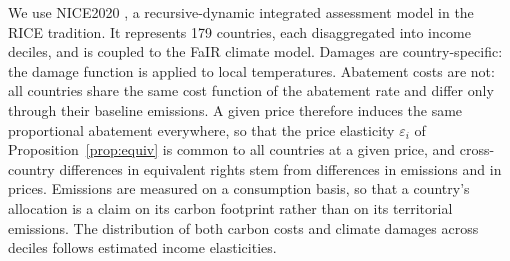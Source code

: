 \documentclass[12pt,english]{article}
\theoremstyle{remark}
\begin{document}
We use NICE2020 \citep{young-brun_within-country_2025}, a recursive-dynamic integrated assessment model in the RICE tradition. It represents 179 countries, each disaggregated into income deciles, and is coupled to the FaIR climate model. Damages are country-specific: the damage function is applied to local temperatures. 
Abatement costs are not: all countries share the same cost function of the abatement rate %
and differ only through their baseline emissions. %
A given price therefore induces the same proportional abatement everywhere, so that the price elasticity $\varepsilon_i$ of Proposition~\ref{prop:equiv} is common to all countries at a given price, and cross-country differences in equivalent rights stem from differences in emissions and in prices. %
Emissions are measured on a consumption basis, %
so that a country's allocation is a claim on its carbon footprint rather than on its territorial emissions. The distribution of both carbon costs and climate damages across deciles follows estimated income elasticities.  %
\end{document}
